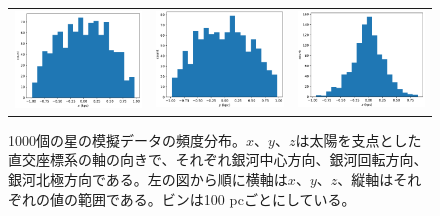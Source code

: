 \begin{figure}
   \centering
\begin{tabular}{ccc}
\includegraphics[width=4.5cm]{fig/dist_x.pdf}&
\includegraphics[width=4.5cm]{fig/dist_y.pdf}&
\includegraphics[width=4.5cm]{fig/dist_z.pdf}
\end{tabular}
    \caption{1000個の星の模擬データの頻度分布。$x、y、z$は太陽を支点とした直交座標系の軸の向きで、それぞれ銀河中心方向、銀河回転方向、銀河北極方向である。左の図から順に横軸は$x、y、z$、縦軸はそれぞれの値の範囲である。ビンは100 pcごとにしている。}
    \label{distMockData}
\end{figure}

